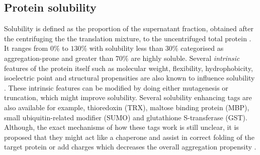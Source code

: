 \subsection{Protein solubility}




Solubility is defined as the proportion of the supernatant fraction, obtained after the centrifuging the the translation mixture, to the uncentrifuged total protein \cite{Niwa2009-ye}. It ranges from $0\%$ to $130\%$ with solubility less than $30\%$ categorised as aggregation-prone and greater than $70\%$ are highly soluble. Several \textit{intrinsic} features of the protein itself such as molecular weight, flexibility, hydrophobicity, isoelectric point and structural propensities are also known to influence solubility \cite{Wilkinson1991-zp, Chiti2003-zk, Tartaglia2004-wm, Diaz2010-md}. These intrinsic features can be modified by doing either mutagenesis or truncation, which might improve solubility. Several solubility enhancing tags are also available for example, thioredoxin (TRX), maltose binding protein (MBP), small ubiquitin-related modifier (SUMO) and glutathione S-transferase (GST). Although, the exact mechanisms of how these tags work is still unclear, it is proposed that they might act like a chaperone and assist in correct folding of the target protein or add charges which decreases the overall aggregation propensity \cite{Costa2014-oe}.

